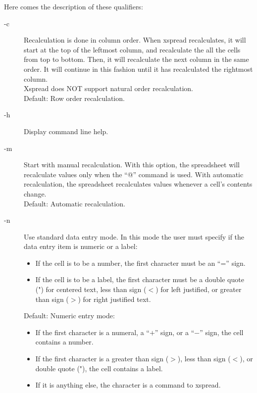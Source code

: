 %
Here comes the description of these qualifiers:
\begin{description}
\item[-c]{ Recalculation is done in column order.  When xspread recalculates, it will
start at the top of the leftmost column, and recalculate the all the cells 
from top to bottom.  Then, it will recalculate the next column in the same 
order.  It will continue in this fashion until it has recalculated the 
rightmost column.\\
Xspread does NOT support natural order recalculation.\\
Default:  Row order recalculation.}

\item[-h]{  Display command line help.}

\item[-m]{  Start with manual recalculation.  With this option, the spreadsheet will
recalculate values only when the ``@'' command is used.  With automatic
recalculation, the spreadsheet recalculates values whenever a cell's 
contents change.\\
Default:  Automatic recalculation.}

\item[-n]{Use standard data entry mode.  In this mode the user must specify if
     the data entry item is numeric or a label:}


  \begin{itemize}
  \item{If the cell is to be a number, the first character must be an ``=''
        sign.}
  \item{If the cell is to be a label, the first character must be a double
        quote (") for centered text, less than sign ($<$) for left justified,
        or greater than sign ($>$) for right justified text.}
  \end{itemize}

Default:  Numeric entry mode:
  \begin{itemize}
  \item{If the first character is a numeral, a ``$+$'' sign, or a ``$-$'' sign,
	the cell contains a number.}
  \item{If the first character is a greater than sign ($>$), less than 
     sign ($<$), or double quote ("), the cell contains a label.}
  \item{If it is anything else, the character is a command to xspread.}
  \end{itemize}



\end{description}
